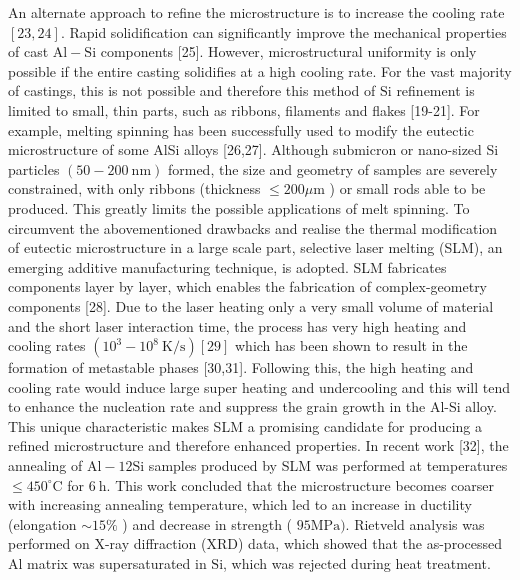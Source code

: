 \documentclass[10pt]{article}
\begin{document}
An alternate approach to refine the microstructure is to increase the cooling rate $[23,24]$. Rapid solidification can significantly improve the mechanical properties of cast $\mathrm{Al}-\mathrm{Si}$ components [25]. However, microstructural uniformity is only possible if the entire casting solidifies at a high cooling rate. For the vast majority of castings, this is not possible and therefore this method of $\mathrm{Si}$ refinement is limited to small, thin parts, such as ribbons, filaments and flakes [19-21]. For example, melting spinning has been successfully used to modify the eutectic microstructure of some AlSi alloys [26,27]. Although submicron or nano-sized Si particles $(50-200 \mathrm{~nm})$ formed, the size and geometry of samples are severely constrained, with only ribbons (thickness $\leqslant 200 \mu \mathrm{m}$ ) or small rods able to be produced. This greatly limits the possible applications of melt spinning. To circumvent the abovementioned drawbacks and realise the thermal modification of eutectic microstructure in a large scale part, selective laser melting (SLM), an emerging additive manufacturing technique, is adopted. SLM fabricates components layer by layer, which enables the fabrication of complex-geometry components [28]. Due to the laser heating only a very small volume of material and the short laser interaction time, the process has very high heating and cooling rates $\left(10^{3}-10^{8} \mathrm{~K} / \mathrm{s}\right)[29]$ which has been shown to result in the formation of metastable phases [30,31]. Following this, the high heating and cooling rate would induce large super heating and undercooling and this will tend to enhance the nucleation rate and suppress the grain growth in the Al-Si alloy. This unique characteristic makes SLM a promising candidate for producing a refined microstructure and therefore enhanced properties. In recent work [32], the annealing of $\mathrm{Al}-12 \mathrm{Si}$ samples produced by SLM was performed at temperatures $\leqslant 450^{\circ} \mathrm{C}$ for $6 \mathrm{~h}$. This work concluded that the microstructure becomes coarser with increasing annealing temperature, which led to an increase in ductility (elongation $\sim 15 \%$ ) and decrease in strength ( $95 \mathrm{MPa})$. Rietveld analysis was performed on X-ray diffraction (XRD) data, which showed that the as-processed Al matrix was supersaturated in $\mathrm{Si}$, which was rejected during heat treatment.
\end{document}
